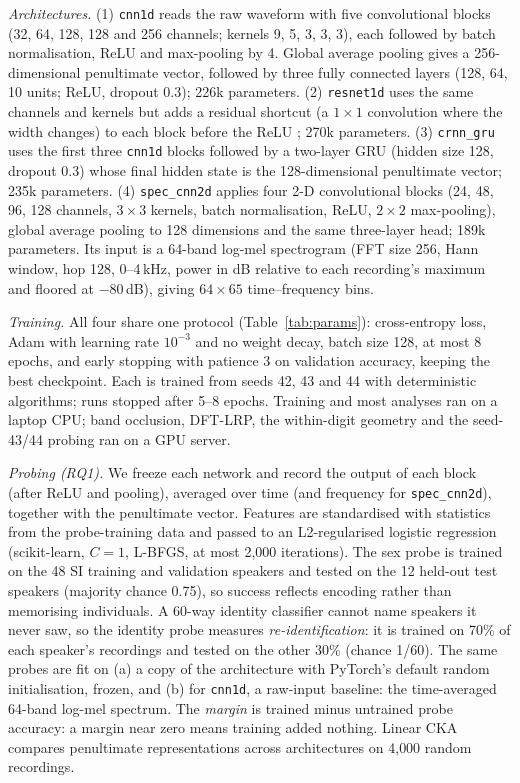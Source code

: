 \documentclass[conference]{IEEEtran}
\begin{document}
\emph{Architectures.} (1) \texttt{cnn1d} reads the raw waveform with five
convolutional blocks (32, 64, 128, 128 and 256 channels; kernels 9, 5, 3, 3,
3), each followed by batch normalisation, ReLU and max-pooling by 4. Global
average pooling gives a 256-dimensional penultimate vector, followed by
three fully connected layers (128, 64, 10 units; ReLU, dropout 0.3); 226k
parameters. (2) \texttt{resnet1d} uses the same channels and kernels but adds
a residual shortcut (a $1\times1$ convolution where the width changes) to
each block before the ReLU \cite{he2016resnet}; 270k parameters. (3)
\texttt{crnn\_gru} uses the first three \texttt{cnn1d} blocks followed by a
two-layer GRU \cite{cho2014gru} (hidden size 128, dropout 0.3) whose final
hidden state is the 128-dimensional penultimate vector; 235k parameters. (4)
\texttt{spec\_cnn2d} applies four 2-D convolutional blocks (24, 48, 96, 128
channels, $3\times3$ kernels, batch normalisation, ReLU, $2\times2$
max-pooling), global average pooling to 128 dimensions and the same
three-layer head; 189k parameters. Its input is a 64-band log-mel spectrogram
(FFT size 256, Hann window, hop 128, 0--4\,kHz, power in dB relative to each
recording's maximum and floored at $-80$\,dB), giving $64\times65$
time--frequency bins.

\emph{Training.} All four share one protocol (Table~\ref{tab:params}):
cross-entropy loss, Adam with learning rate $10^{-3}$ and no weight decay,
batch size 128, at most 8 epochs, and early stopping with patience 3 on
validation accuracy, keeping the best checkpoint. Each is trained from seeds
42, 43 and 44 with deterministic algorithms; runs stopped after 5--8 epochs.
Training and most analyses ran on a laptop CPU; band occlusion, DFT-LRP, the
within-digit geometry and the seed-43/44 probing ran on a GPU server.

\emph{Probing (RQ1).} We freeze each network and record the output of each
block (after ReLU and pooling), averaged over time (and frequency for
\texttt{spec\_cnn2d}), together with the penultimate vector. Features are
standardised with statistics from the probe-training data and passed to an
L2-regularised logistic regression (scikit-learn, $C=1$, L-BFGS, at most
2{,}000 iterations). The sex probe is trained on the 48 SI training and
validation speakers and tested on the 12 held-out test speakers (majority
chance 0.75), so success reflects encoding rather than memorising
individuals. A 60-way identity classifier cannot name speakers it never saw,
so the identity probe measures \emph{re-identification}: it is trained on
70\% of each speaker's recordings and tested on the other 30\% (chance 1/60).
The same probes are fit on (a) a copy of the architecture with PyTorch's
default random initialisation, frozen, and (b) for \texttt{cnn1d}, a raw-input
baseline: the time-averaged 64-band log-mel spectrum. The \emph{margin} is
trained minus untrained probe accuracy: a margin near zero means training
added nothing. Linear CKA \cite{kornblith2019cka} compares penultimate
representations across architectures on 4{,}000 random recordings.
\end{document}
